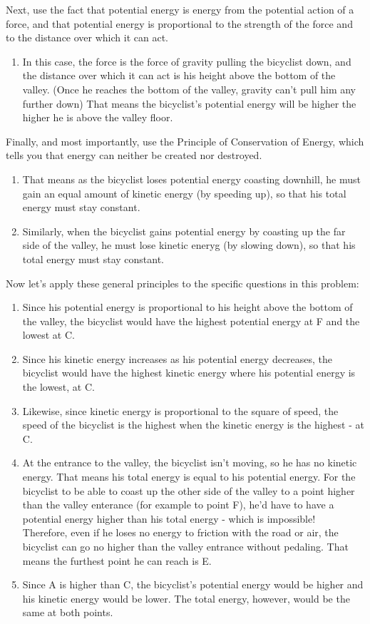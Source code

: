 \documentclass{article}  %
\begin{document}
Next, use the fact that potential energy is energy from the potential action of a force, and that potential energy is proportional to the strength of the force and to the distance over which it can act.
\begin{enumerate}
    \item In this case, the force is the force of gravity pulling the bicyclist down, and the distance over which it can act is his height above the bottom of the valley. (Once he reaches the bottom of the valley, gravity can't pull him any further down) That means the bicyclist's potential energy will be higher the higher he is above the valley floor.
\end{enumerate}
Finally, and most importantly, use the Principle of Conservation of Energy, which tells you that energy can neither be created nor destroyed. 
\begin{enumerate}
    \item That means as the bicyclist loses potential energy coasting downhill, he must gain an equal amount of kinetic energy (by speeding up), so that his total energy must stay constant.
    \item Similarly, when the bicyclist gains potential energy by coasting up the far side of the valley, he must lose kinetic eneryg (by slowing down), so that his total energy must stay constant.
\end{enumerate}
Now let's apply these general principles to the specific questions in this problem:
\begin{enumerate}
    \item Since his potential energy is proportional to his height above the bottom of the valley, the bicyclist would have the highest potential energy at F and the lowest at C.
    \item Since his kinetic energy increases as his potential energy decreases, the bicyclist would have the highest kinetic energy where his potential energy is the lowest, at C.
    \item Likewise, since kinetic energy is proportional to the square of speed, the speed of the bicyclist is the highest when the kinetic energy is the highest - at C. 
    \item At the entrance to the valley, the bicyclist isn't moving, so he has no kinetic energy. That means his total energy is equal to his potential energy. For the bicyclist to be able to coast up the other side of the valley to a point higher than the valley enterance (for example to point F), he'd have to have a potential energy higher than his total energy - which is impossible! \\
    Therefore, even if he loses no energy to friction with the road or air, the bicyclist can go no higher than the valley entrance without pedaling. That means the furthest point he can reach is E. 
    \item Since A is higher than C, the bicyclist's potential energy would be higher and his kinetic energy would be lower. The total energy, however, would be the same at both points.
\end{enumerate}
\end{document}
